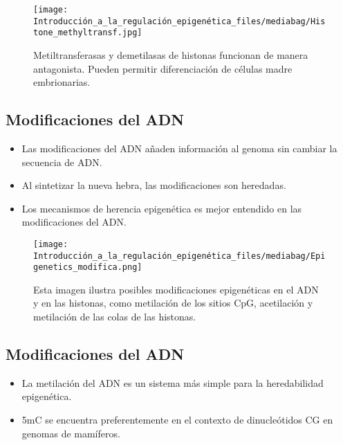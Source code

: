 \documentclass[
  letterpaper,
  DIV=11,
  numbers=noendperiod]{scrartcl}
\providecommand{\tightlist}{%
  \setlength{\itemsep}{0pt}\setlength{\parskip}{0pt}}\usepackage{longtable,booktabs,array}
\begin{document}
\begin{figure}[H]

{\centering \texttt{[image: Introducción\_a\_la\_regulación\_epigenética\_files/mediabag/Histone\_methyltransf.jpg]}

}

\caption{Metiltransferasas y demetilasas de histonas funcionan de manera
antagonista. Pueden permitir diferenciación de células madre
embrionarias.}

\end{figure}%

\subsection{Modificaciones del ADN}\label{modificaciones-del-adn}

\begin{itemize}
\tightlist
\item
  Las modificaciones del ADN añaden información al genoma sin cambiar la
  secuencia de ADN.
\item
  Al sintetizar la nueva hebra, las modificaciones son heredadas.
\item
  Los mecanismos de herencia epigenética es mejor entendido en las
  modificaciones del ADN.
\end{itemize}

\begin{figure}[H]

{\centering \texttt{[image: Introducción\_a\_la\_regulación\_epigenética\_files/mediabag/Epigenetics\_modifica.png]}

}

\caption{Esta imagen ilustra posibles modificaciones epigenéticas en el
ADN y en las histonas, como metilación de los sitios CpG, acetilación y
metilación de las colas de las histonas.}

\end{figure}%

\subsection{Modificaciones del ADN}\label{modificaciones-del-adn-1}

\begin{itemize}
\tightlist
\item
  La metilación del ADN es un sistema más simple para la heredabilidad
  epigenética.
\item
  5mC se encuentra preferentemente en el contexto de dinucleótidos CG en
  genomas de mamíferos.
\end{itemize}
\end{document}
